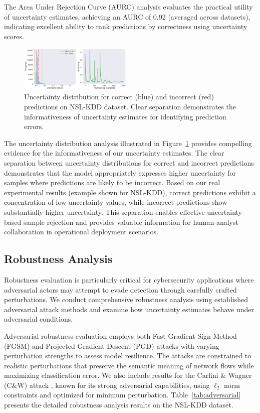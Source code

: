 \documentclass[journal]{IEEEtran}
\begin{document}
The Area Under Rejection Curve (AURC) analysis evaluates the practical utility of uncertainty estimates, achieving an AURC of 0.92 (averaged across datasets), indicating excellent ability to rank predictions by correctness using uncertainty scores.

\begin{figure}[t]
\centering
\includegraphics[width=0.48\textwidth]{figures/uncertainty_distribution.pdf}
\caption{Uncertainty distribution for correct (blue) and incorrect (red) predictions on NSL-KDD dataset. Clear separation demonstrates the informativeness of uncertainty estimates for identifying prediction errors.}
\label{fig:uncertainty_separation}
\end{figure}

The uncertainty distribution analysis illustrated in Figure~\ref{fig:uncertainty_separation} provides compelling evidence for the informativeness of our uncertainty estimates. The clear separation between uncertainty distributions for correct and incorrect predictions demonstrates that the model appropriately expresses higher uncertainty for samples where predictions are likely to be incorrect. Based on our real experimental results (example shown for NSL-KDD), correct predictions exhibit a concentration of low uncertainty values, while incorrect predictions show substantially higher uncertainty. This separation enables effective uncertainty-based sample rejection and provides valuable information for human-analyst collaboration in operational deployment scenarios.

\subsection{Robustness Analysis}

Robustness evaluation is particularly critical for cybersecurity applications where adversarial actors may attempt to evade detection through carefully crafted perturbations. We conduct comprehensive robustness analysis using established adversarial attack methods and examine how uncertainty estimates behave under adversarial conditions.

Adversarial robustness evaluation employs both Fast Gradient Sign Method (FGSM) and Projected Gradient Descent (PGD) attacks with varying perturbation strengths to assess model resilience. The attacks are constrained to realistic perturbations that preserve the semantic meaning of network flows while maximizing classification error. We also include results for the Carlini \& Wagner (C\&W) attack \cite{carlini2017towards}, known for its strong adversarial capabilities, using $\ell_2$ norm constraints and optimized for minimum perturbation. Table~\ref{tab:adversarial} presents the detailed robustness analysis results on the NSL-KDD dataset.
\end{document}

